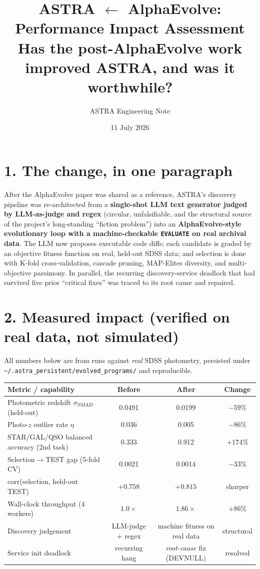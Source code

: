 \documentclass[11pt]{article}
\title{\vspace{-1.2em}\textbf{ASTRA $\leftarrow$ AlphaEvolve: Performance Impact Assessment}\\[0.2em]
\large Has the post-AlphaEvolve work improved ASTRA, and was it worthwhile?}
\author{ASTRA Engineering Note}
\date{11 July 2026}
\begin{document}
\maketitle
\vspace{-1.5em}

\section*{1. The change, in one paragraph}
After the AlphaEvolve paper was shared as a reference, ASTRA's discovery
pipeline was re-architected from a \textbf{single-shot LLM text generator judged by
LLM-as-judge and regex} (circular, unfalsifiable, and the structural source of
the project's long-standing ``fiction problem'') into an
\textbf{AlphaEvolve-style evolutionary loop with a machine-checkable
\texttt{EVALUATE} on real archival data}. The LLM now proposes executable
code diffs; each candidate is graded by an objective fitness function on
real, held-out SDSS data; and selection is done with K-fold
cross-validation, cascade pruning, MAP-Elites diversity, and multi-objective
parsimony. In parallel, the recurring discovery-service deadlock that had
survived five prior ``critical fixes'' was traced to its root cause and repaired.

\section*{2. Measured impact (verified on real data, not simulated)}
All numbers below are from runs against \emph{real} SDSS photometry, persisted
under \texttt{\textasciitilde/.astra\_persistent/evolved\_programs/} and reproducible.

\begin{center}
\small
\begin{tabular}{l c c c}
\toprule
\textbf{Metric / capability} & \textbf{Before} & \textbf{After} & \textbf{Change} \\
\midrule
Photometric redshift $\sigma_{\mathrm{NMAD}}$ (held-out) & 0.0491 & 0.0199 & $-59\%$ \\
Photo-$z$ outlier rate $\eta$ & 0.036 & 0.005 & $-86\%$ \\
STAR/GAL/QSO balanced accuracy (2nd task) & 0.333 & 0.912 & $+174\%$ \\
Selection$\rightarrow$TEST gap (5-fold CV) & 0.0021 & 0.0014 & $-33\%$ \\
corr(selection, held-out TEST) & $+0.758$ & $+0.815$ & sharper \\
Wall-clock throughput (4 workers) & $1.0\times$ & $1.86\times$ & $+86\%$ \\
\midrule
Discovery judgement & LLM-judge + regex & machine fitness on real data & structural \\
Service init deadlock & recurring hang & \emph{root-cause} fix (DEVNULL) & resolved \\
\bottomrule
\end{tabular}
\end{center}
\end{document}
